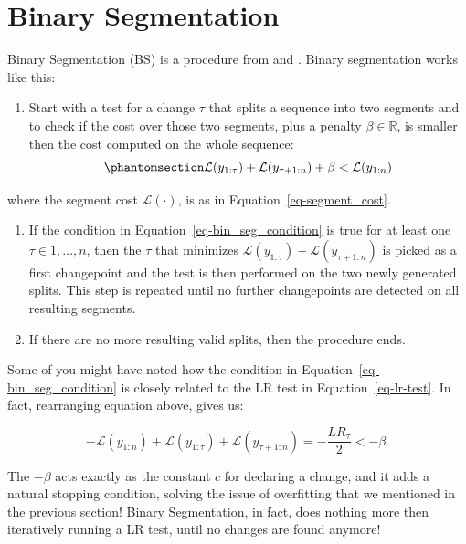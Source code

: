 \documentclass[
  letterpaper,
  DIV=11,
  numbers=noendperiod]{scrreprt}
\providecommand{\tightlist}{%
  \setlength{\itemsep}{0pt}\setlength{\parskip}{0pt}}\usepackage{longtable,booktabs,array}
\begin{document}
\section{Binary Segmentation}\label{binary-segmentation}

Binary Segmentation (BS) is a procedure from \cite{scott1974cluster} and
\cite{sen1975tests}. Binary segmentation works like this:

\begin{enumerate}
\def\labelenumi{\arabic{enumi}.}
\tightlist
\item
  Start with a test for a change \(\tau\) that splits a sequence into
  two segments and to check if the cost over those two segments, plus a
  penalty \(\beta \in \mathbb{R}\), is smaller then the cost computed on
  the whole sequence:
  \begin{equation}\phantomsection\label{eq-bin_seg_condition}{
      \mathcal{L}(y_{1:\tau}) + \mathcal{L}(y_{\tau+1:n}) + \beta < \mathcal{L}(y_{1:n})     
  }\end{equation}
\end{enumerate}

where the segment cost \(\mathcal{L}(\cdot)\), is as in
Equation~\ref{eq-segment_cost}.

\begin{enumerate}
\def\labelenumi{\arabic{enumi}.}
\setcounter{enumi}{1}
\item
  If the condition in Equation~\ref{eq-bin_seg_condition} is true for at
  least one \(\tau \in 1, \dots, n\), then the \(\tau\) that minimizes
  \(\mathcal{L}(y_{1:\tau}) + \mathcal{L}(y_{\tau+1:n})\) is picked as a
  first changepoint and the test is then performed on the two newly
  generated splits. This step is repeated until no further changepoints
  are detected on all resulting segments.
\item
  If there are no more resulting valid splits, then the procedure ends.
\end{enumerate}

Some of you might have noted how the condition in
Equation~\ref{eq-bin_seg_condition} is closely related to the LR test in
Equation~\ref{eq-lr-test}. In fact, rearranging equation above, gives
us:

\[
- \mathcal{L}(y_{1:n}) + \mathcal{L}(y_{1:\tau}) + \mathcal{L}(y_{\tau+1:n}) = - \frac{LR_\tau}{2}  < -\beta.
\]

The \(-\beta\) acts exactly as the constant \(c\) for declaring a
change, and it adds a natural stopping condition, solving the issue of
overfitting that we mentioned in the previous section! Binary
Segmentation, in fact, does nothing more then iteratively running a LR
test, until no changes are found anymore!
\end{document}
